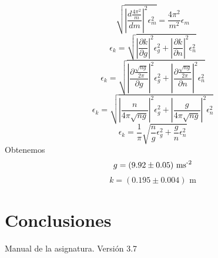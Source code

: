 \documentclass{article}
\begin{document}
\begin{multicols}{2}
$$\sqrt{ \left| \frac{d \frac{4\pi^2}{m}}{dm} \right|^2 \epsilon_m^2 } =
\frac{4\pi^2}{m^2}\epsilon_m
$$
$$
\epsilon_k =
\sqrt{
  \left| \frac{\partial k}{\partial g} \right|^2 \epsilon_g^2 +
  \left| \frac{\partial k}{\partial n} \right|^2 \epsilon_n^2
}
$$
$$
\epsilon_k = \sqrt{
  \left| \frac{\partial \frac{\sqrt{ng}}{2\pi}}{\partial g} \right|^2 \epsilon_g^2 +
  \left| \frac{\partial \frac{\sqrt{ng}}{2\pi}}{\partial n} \right|^2 \epsilon_n^2
}
$$
$$
\epsilon_k = \sqrt{
  \left| \frac{n}{4\pi\sqrt{ng}} \right|^2 \epsilon_g^2 +
  \left| \frac{g}{4\pi\sqrt{ng}} \right|^2 \epsilon_n^2
}
$$
$$
\epsilon_k =
\frac{1}{\pi} \sqrt{\frac{n}{g} \epsilon_g^2 + \frac{g}{n} \epsilon_n^2}
$$
Obtenemos
$$
g = (9.92 \pm 0.05) \text{ ms\textsuperscript{-2}}
$$
$$
k = (0.195 \pm 0.004) \text{ m}
$$
\section{Conclusiones}

\begin{thebibliography}{1}

  Manual de la asignatura. Versión 3.7

\end{thebibliography}

\end{multicols}
\end{document}
